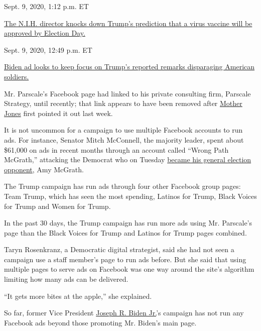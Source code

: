 Sept. 9, 2020, 1:12 p.m. ET

\href{https://www.nytimes3xbfgragh.onion/live/2020/09/09/us/trump-vs-biden\#the-nih-director-knocks-down-trumps-prediction-that-a-virus-vaccine-will-be-approved-by-election-day}{The
N.I.H. director knocks down Trump's prediction that a virus vaccine will
be approved by Election
Day.}\href{https://www.nytimes3xbfgragh.onion/live/2020/09/09/us/trump-vs-biden\#biden-ad-looks-to-keep-focus-on-trumps-reported-remarks-disparaging-american-soldiers}{}

Sept. 9, 2020, 12:49 p.m. ET

\href{https://www.nytimes3xbfgragh.onion/live/2020/09/09/us/trump-vs-biden\#biden-ad-looks-to-keep-focus-on-trumps-reported-remarks-disparaging-american-soldiers}{Biden
ad looks to keep focus on Trump's reported remarks disparaging American
soldiers.}

Mr. Parscale's Facebook page had linked to his private consulting firm,
Parscale Strategy, until recently; that link appears to have been
removed after
\href{https://www.motherjones.com/politics/2020/06/why-do-these-trump-campaign-ads-link-to-brad-parscales-facebook-page/}{Mother
Jones} first pointed it out last week.

It is not uncommon for a campaign to use multiple Facebook accounts to
run ads. For instance, Senator Mitch McConnell, the majority leader,
spent about \$61,000 on ads in recent months through an account called
``Wrong Path McGrath,'' attacking the Democrat who on Tuesday
\href{https://www.nytimes3xbfgragh.onion/2020/06/30/us/politics/kentucky-senate-mcgrath-booker.html}{became
his general election opponent}, Amy McGrath.

The Trump campaign has run ads through four other Facebook group pages:
Team Trump, which has seen the most spending, Latinos for Trump, Black
Voices for Trump and Women for Trump.

In the past 30 days, the Trump campaign has run more ads using Mr.
Parscale's page than the Black Voices for Trump and Latinos for Trump
pages combined.

Taryn Rosenkranz, a Democratic digital strategist, said she had not seen
a campaign use a staff member's page to run ads before. But she said
that using multiple pages to serve ads on Facebook was one way around
the site's algorithm limiting how many ads can be delivered.

``It gets more bites at the apple,'' she explained.

So far, former Vice President
\href{https://www.nytimes3xbfgragh.onion/interactive/2020/us/elections/joe-biden.html}{Joseph
R. Biden Jr.}'s campaign has not run any Facebook ads beyond those
promoting Mr. Biden's main page.

